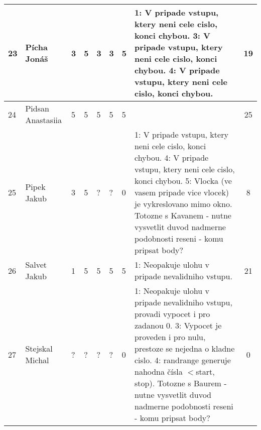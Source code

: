 \documentclass[landscape, 12pt]{article}
\begin{document}
\begin{longtable}{|l l | C{0.7cm} | C{0.7cm} | C{0.7cm} | C{0.7cm} | C{0.7cm} | L{15cm} |c|}
  23 & Pícha Jonáš        &       3 &       5 &       3 &       3 &       5 & 1: V pripade vstupu, ktery neni cele cislo, konci chybou. 3: V pripade vstupu, ktery neni cele cislo, konci chybou. 4: V pripade vstupu, ktery neni cele cislo, konci chybou.                                                                                                                                                                                                                             &       19 \\
\hline

  24 & Pidsan Anastasiia  &       5 &       5 &       5 &       5 &       5 &                                                                                                                                                                                                                                                                                                                                                                                      &       25 \\
\hline

  25 & Pipek Jakub        &       3 &       5 &       ? &       ? &       0 & 1: V pripade vstupu, ktery neni cele cislo, konci chybou. 4: V pripade vstupu, ktery neni cele cislo, konci chybou. 5: Vlocka (ve vasem pripade vice vlocek) je vykreslovano mimo okno.                                                                                                                Totozne s Kavanem - nutne vysvetlit duvod nadmerne podobnosti reseni - komu pripsat body?                                                                                                                   &       8 \\
\hline

  26 & Salvet Jakub       &       1 &       5 &       5 &       5 &       5 & 1: Neopakuje ulohu v pripade nevalidniho vstupu.                                                                                                                                                                                                                                                                                                                                        &       21 \\
\hline

  27 & Stejskal Michal    &       ? &       ? &       ? &       ? &       0 & 1: Neopakuje ulohu v pripade nevalidniho vstupu, provadi vypocet i pro zadanou 0. 3: Vypocet je proveden i pro nulu, prestoze se nejedna o kladne cislo. 4: randrange generuje nahodna čísla \ensuremath{<}start, stop). Totozne s Baurem - nutne vysvetlit duvod nadmerne podobnosti reseni - komu pripsat body?                                                                                                                                                                                  &       0 \\
\hline


\end{longtable}
\end{document}
